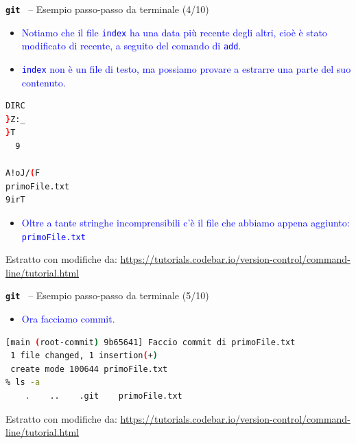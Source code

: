 \documentclass{beamer}
\newcommand{\git}{\texttt{\textbf{git}}\xspace}
\begin{document}
\begin{frame}[fragile]{\centerline{\git ~ -- Esempio passo-passo da terminale (4/10)}}
\begin{itemize}
\item \textcolor{blue}{Notiamo che il file \texttt{index} ha una data pi\`{u} recente degli altri, cio\`{e} \`{e} stato modificato di recente, a seguito del comando di \texttt{add}.}
\item \textcolor{blue}{\texttt{index} non \`{e} un file di testo, ma possiamo provare a estrarre una parte del suo contenuto.}

\end{itemize}
\begin{lstlisting}[language=sh]
% strings index
DIRC
}Z:_
}T
  9

A!oJ/(F
primoFile.txt
9irT
\end{lstlisting}
\begin{itemize}
\item \textcolor{blue}{Oltre a tante stringhe incomprensibili c'\`{e} il file che abbiamo appena aggiunto: \texttt{primoFile.txt}}
\end{itemize}

\begin{center}
    \tiny Estratto con modifiche da: \url{https://tutorials.codebar.io/version-control/command-line/tutorial.html}
\end{center}
\end{frame}

\begin{frame}[fragile]{\centerline{\git ~ -- Esempio passo-passo da terminale (5/10)}}
\begin{itemize}
\item \textcolor{blue}{Ora facciamo commit.}

\end{itemize}
\begin{lstlisting}[language=sh]
% git commit -m "Faccio commit di primoFile.txt"
[main (root-commit) 9b65641] Faccio commit di primoFile.txt
 1 file changed, 1 insertion(+)
 create mode 100644 primoFile.txt
% ls -a
    .    ..    .git    primoFile.txt

\end{lstlisting}

\begin{center}
    \tiny Estratto con modifiche da: \url{https://tutorials.codebar.io/version-control/command-line/tutorial.html}
\end{center}
\end{frame}
\end{document}
